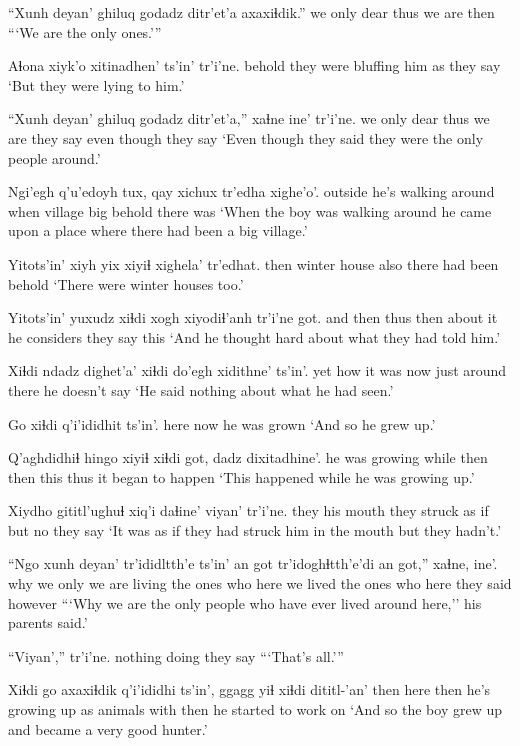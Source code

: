 \documentclass[12pt]{article}
\begin{document}
\gll ``Xunh deyan' ghiluq godadz ditr'et'a axaxiɬdik.''
we only  dear thus {we are}  then
\glt ```We are the only ones.'''
\glend

\gll Aɬona {xiyk'o xitinadhen'} ts'in' tr'i'ne.
behold {they were bluffing him} as they say
\glt `But they were lying to him.'
\glend

\gll ``Xunh deyan' ghiluq godadz ditr'et'a,'' xaɬne  ine'  tr'i'ne.
we  only  dear  thus  {we are} {they say} {even though} {they say}
\glt `Even though they said they were the only people around.'
\glend

\gll Ngi'egh q'u'edoyh tux, qay xichux tr'edha xighe'o'.
outside {he's walking around} when village big  behold {there was} 
\glt `When the boy was walking around he came upon a place where there had been a big village.'
\glend

\gll Yitots'in' xiyh yix  xiyiɬ xighela'  tr'edhat.
then  winter house also {there had been}  behold
\glt  `There were winter houses too.'
\glend

\gll Yitots'in' yuxudz xiɬdi xogh xiyodiɬ'anh tr'i'ne got.
{and then} thus then {about it} {he considers} {they say} {this}
\glt `And he thought hard about what they had told him.'
\glend

\gll Xiɬdi ndadz dighet'a' xiɬdi do'egh {xidithne' ts'in'.}
yet how  {it was} now {just around there} {he doesn't say}
\glt `He said nothing about what he had seen.'
\glend

\gll Go xiɬdi q'i'ididhit ts'in'.
here now {he was grown}
\glt `And so he grew up.'
\glend

\gll Q'aghdidhiɬ hingo xiyiɬ  xiɬdi got, dadz dixitadhine'.
{he was growing} while then then this thus {it began to happen}
\glt `This happened while he was growing up.'
\glend

\gll Xiydho gititl'ughuɬ xiq'i daɬine' viyan' tr'i'ne.
{they his mouth} {they struck} {as if} but no {they say}
\glt `It was as if they had struck him in the mouth but they hadn't.'
\glend

\gll ``Ngo xunh deyan' tr'ididltth'e ts'in' an got tr'idoghɬtth'e'di an got,'' xaɬne,  ine'.
why we only {we are living} {} {the ones who} here {we lived} {the ones who} here {they said} however
\glt ```Why we are the only people who have ever lived around here,'' his parents said.'
\glend

\gll ``Viyan',''  tr'i'ne.
{nothing doing} {they say}
\glt ```That's all.'''
\glend

\gll Xiɬdi go  axaxiɬdik q'i'ididhi ts'in', ggagg  yiɬ xiɬdi dititl-'an'
then  here  then  {he's growing up} as animals with then {he started to work on}
\glt `And so the boy grew up and became a very good hunter.'
\glend
\end{document}
